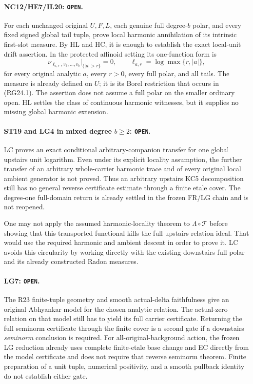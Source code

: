 \paragraph{NC12/HE7/IL20: \texttt{OPEN}.}
For each unchanged original \(U,F,L\), each genuine full
degree-\(b\) polar, and every fixed signed global tail tuple,
prove local harmonic annihilation of its intrinsic first-slot
measure.  By HL and HC, it is enough to establish the exact
local-unit drift assertion.  In the protected affinoid setting
its one-function form is
\[
 \nu_{\ell_{a,r},v_3,\ldots,v_b}\big|_{\{|a|>r\}}=0,
 \qquad \ell_{a,r}=\log\max\{r,|a|\},                 \tag{RG24.1}
\]
for every original analytic \(a\), every \(r>0\), every
full polar, and all tails.  The measure is already defined on
\(U\); it is its Borel restriction that occurs in (RG24.1).
The assertion does not assume a full polar on the smaller
ordinary open.  HL settles the class of continuous harmonic
witnesses, but it supplies no missing global harmonic extension.

\paragraph{ST19 and LG4 in mixed degree \(b\ge2\): \texttt{OPEN}.}
LC proves an exact conditional arbitrary-companion transfer
for one global upstairs unit logarithm.  Even under its explicit
locality assumption, the further transfer of an arbitrary
whole-carrier harmonic trace and of every original local ambient
generator is not proved.  Thus an arbitrary upstairs KC5
decomposition still has no general reverse certificate estimate
through a finite etale cover.  The degree-one full-domain return
is already settled in the frozen FR/LG chain and is not reopened.

One may not apply the assumed harmonic-locality theorem to
\(\Lambda\circ\mathcal T\) before showing that this transported
functional kills the full upstairs relation ideal.  That would
use the required harmonic and ambient descent in order to prove
it.  LC avoids this circularity by working directly with the
existing downstairs full polar and its already constructed
Radon measures.

\paragraph{LG7: \texttt{OPEN}.}
The R23 finite-tuple geometry and smooth actual-delta faithfulness
give an original Abhyankar model for the chosen analytic relation.
The actual-zero relation on that model still has to yield its
full carrier certificate.  Returning the full seminorm certificate
through the finite cover is a second gate if a downstairs
\emph{seminorm} conclusion is required.  For all-original-background
action, the frozen LG reduction already uses complete finite-etale
base change and EC directly from the model certificate and does
not require that reverse seminorm theorem.  Finite preparation
of a unit tuple, numerical positivity, and a smooth pullback
identity do not establish either gate.

